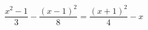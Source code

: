 \begin{ex}[type=equation]
	\begin{condition}
		\( \dfrac{x^2-1}{3}-\dfrac{(x-1)^2}{8}=\dfrac{(x+1)^2}{4}-x \)
	\end{condition}
\end{ex}